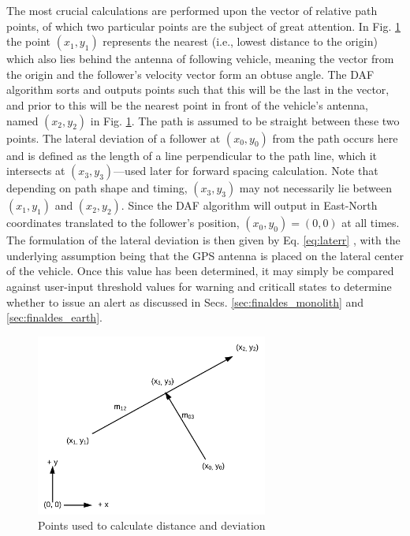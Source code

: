 \documentclass[12pt]{report}
\begin{document}
The most crucial calculations are performed upon the vector of relative path points, of which two particular points are the subject of great attention. In Fig. \ref{fig:pathpts} the point $(x_1,y_1)$ represents the nearest (i.e., lowest distance to the origin) which also lies behind the antenna of following vehicle, meaning the vector from the origin and the follower's velocity vector form an obtuse angle. The DAF algorithm sorts and outputs points such that this will be the last in the vector, and prior to this will be the nearest point in front of the vehicle's antenna, named $(x_2,y_2)$ in Fig. \ref{fig:pathpts}. The path is assumed to be straight between these two points. The lateral deviation of a follower at $(x_0, y_0)$ from the path occurs here and is defined as the length of a line perpendicular to the path line, which it intersects at $(x_3,y_3)$---used later for forward spacing calculation. Note that depending on path shape and timing, $(x_3,y_3)$ may not necessarily lie between $(x_1,y_1)$ and $(x_2,y_2)$. Since the DAF algorithm will output in East-North coordinates translated to the follower's position, $(x_0, y_0)=(0,0)$ at all times. The formulation of the lateral deviation is then given by Eq. \ref{eq:laterr} \cite{laterrformula}, with the underlying assumption being that the GPS antenna is placed on the lateral center of the vehicle. Once this value has been determined, it may simply be compared against user-input threshold values for warning and criticall states to determine whether to issue an alert as discussed in Secs. \ref{sec:finaldes_monolith} and \ref{sec:finaldes_earth}.

\begin{figure}[ht] \label{fig:pathpts} \centering
    \includegraphics[width=3in]{./figs/path_points.png}
    \caption{Points used to calculate distance and deviation}
\end{figure}
\end{document}

